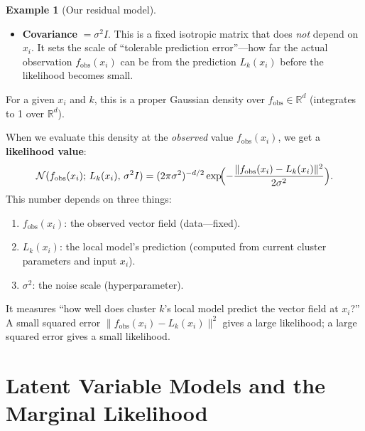 \documentclass[11pt]{article}
\theoremstyle{definition}
\newtheorem{example}{Example}[section]
\theoremstyle{plain}
\theoremstyle{remark}
\newcommand{\R}{\mathbb{R}}
\newcommand{\Sv}{\boldsymbol{\Sigma}}
\begin{document}
\begin{example}[Our residual model]
\begin{itemize}[leftmargin=*,itemsep=2pt]
  We call it ``the mean'' only because of Gaussian convention: in $\mathcal{N}(y;\mu,\Sv)$, the parameter $\mu$ is traditionally called ``the mean'' because if one drew infinitely many samples $y_1,y_2,\dots$ from this distribution, their sample average would converge to $\mu$. But $\mu$ itself is just a location parameter---the point where the bell curve is centered. In our context, a less ambiguous name is \textbf{the predicted value}: $L_k(x_i)$ is the value that the local model predicts the vector field should take at $x_i$, and the Gaussian is centered there.

  \item \textbf{Covariance} $= \sigma^2 I$. This is a fixed isotropic matrix that does \emph{not} depend on $x_i$. It sets the scale of ``tolerable prediction error''---how far the actual observation $f_{\mathrm{obs}}(x_i)$ can be from the prediction $L_k(x_i)$ before the likelihood becomes small.
\end{itemize}
For a given $x_i$ and $k$, this is a proper Gaussian density over $f_{\mathrm{obs}}\in\R^d$ (integrates to 1 over $\R^d$).

When we evaluate this density at the \emph{observed} value $f_{\mathrm{obs}}(x_i)$, we get a \textbf{likelihood value}:
\begin{equation}
  \mathcal{N}(f_{\mathrm{obs}}(x_i);\,L_k(x_i),\,\sigma^2 I) = (2\pi\sigma^2)^{-d/2}\exp\!\Bigl(-\frac{\|f_{\mathrm{obs}}(x_i)-L_k(x_i)\|^2}{2\sigma^2}\Bigr).
  \label{eq:resid-lik}
\end{equation}
This number depends on three things:
\begin{enumerate}[leftmargin=*,itemsep=0pt]
  \item $f_{\mathrm{obs}}(x_i)$: the observed vector field (data---fixed).
  \item $L_k(x_i)$: the local model's prediction (computed from current cluster parameters and input $x_i$).
  \item $\sigma^2$: the noise scale (hyperparameter).
\end{enumerate}
It measures ``how well does cluster $k$'s local model predict the vector field at $x_i$?'' A small squared error $\|f_{\mathrm{obs}}(x_i)-L_k(x_i)\|^2$ gives a large likelihood; a large squared error gives a small likelihood.
\end{example}

\section{Latent Variable Models and the Marginal Likelihood}
\end{document}
